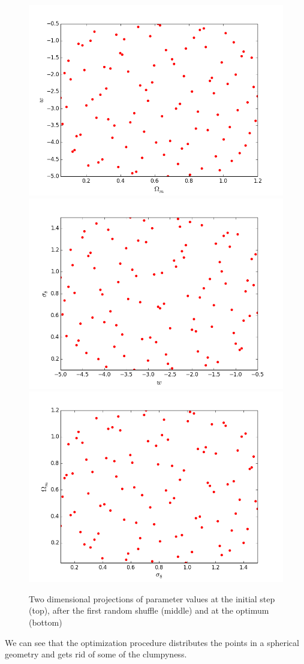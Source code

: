 \documentclass[11pt]{article}
\begin{document}
\begin{figure}
\begin{center}
\includegraphics[scale=0.25]{Figures/optimum1.png}
\includegraphics[scale=0.25]{Figures/optimum2.png}
\includegraphics[scale=0.25]{Figures/optimum3.png}
\end{center}
\caption{Two dimensional projections of parameter values at the initial step (top), after the first random shuffle (middle) and at the optimum (bottom)}
\label{2Dproj}
\end{figure} 
%
We can see that the optimization procedure distributes the points in a spherical geometry and gets rid of some of the clumpyness. 


\end{document}
